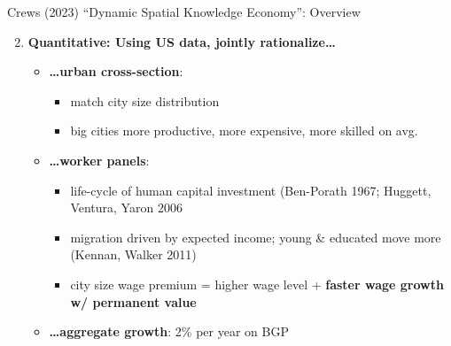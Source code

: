 \documentclass[11pt,notes=hide,aspectratio=169]{beamer}
\begin{document}
\begin{frame}{Crews (2023) ``Dynamic Spatial Knowledge Economy'': Overview}
    \begin{enumerate}
        \setcounter{enumi}{1}
        \item \textbf{Quantitative: Using US data, jointly rationalize\ldots}
        \vspace{0.5em}
        \begin{itemize}
            \setlength\itemsep{0.6em}
            \item \textbf{\ldots urban cross-section}:
            \begin{itemize}
                \item match city size distribution
                \item big cities more productive, more expensive, more skilled on avg.
            \end{itemize}
            \item \textbf{\ldots worker panels}:
            \begin{itemize}
                \item life-cycle of human capital investment {\scriptsize (Ben-Porath 1967; Huggett, Ventura, Yaron 2006}
                \item migration driven by expected income; young \& educated move more {\scriptsize (Kennan, Walker 2011)}
                \item city size wage premium = higher wage level + \textbf{\alert{faster wage growth w/ permanent value}}
            \end{itemize}
            \item \textbf{\ldots aggregate growth}: 2\% per year on BGP
        \end{itemize}
    \end{enumerate}
\end{frame}
\end{document}
